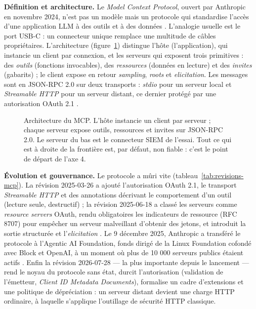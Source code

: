 
\textbf{Définition et architecture.} Le \emph{Model Context Protocol}, ouvert par Anthropic en novembre 2024, n'est pas un modèle mais un protocole qui standardise l'accès d'une application LLM à des outils et à des données \cite{mcpintro}. L'analogie usuelle est le port USB-C : un connecteur unique remplace une multitude de câbles propriétaires. L'architecture (figure~\ref{fig:archi-mcp}) distingue l'hôte (l'application), qui instancie un client par connexion, et les serveurs qui exposent trois primitives : des \emph{outils} (fonctions invocables), des \emph{ressources} (données en lecture) et des \emph{invites} (gabarits) ; le client expose en retour \emph{sampling}, \emph{roots} et \emph{elicitation}. Les messages sont en JSON-RPC 2.0 sur deux transports : \emph{stdio} pour un serveur local et \emph{Streamable HTTP} pour un serveur distant, ce dernier protégé par une autorisation OAuth 2.1 \cite{mcpspec2025}.

\begin{figure}[htbp]
\centering
{}
\caption{Architecture du MCP. L'hôte instancie un client par serveur ; chaque serveur expose outils, ressources et invites sur JSON-RPC 2.0. Le serveur du bas est le connecteur SIEM de l'essai. Tout ce qui est à droite de la frontière est, par défaut, non fiable : c'est le point de départ de l'axe 4.}\label{fig:archi-mcp}
\end{figure}

\textbf{Évolution et gouvernance.} Le protocole a mûri vite (tableau~\ref{tab:revisions-mcp}). La révision 2025-03-26 a ajouté l'autorisation OAuth 2.1, le transport \emph{Streamable HTTP} et des annotations décrivant le comportement d'un outil (lecture seule, destructif) ; la révision 2025-06-18 a classé les serveurs comme \emph{resource servers} OAuth, rendu obligatoires les indicateurs de ressource (RFC 8707) pour empêcher un serveur malveillant d'obtenir des jetons, et introduit la sortie structurée et l'\emph{elicitation} \cite{mcpspec2025}. Le 9 décembre 2025, Anthropic a transféré le protocole à l'Agentic AI Foundation, fonds dirigé de la Linux Foundation cofondé avec Block et OpenAI, à un moment où plus de 10 000 serveurs publics étaient actifs \cite{aaif}. Enfin la révision 2026-07-28 --- la plus importante depuis le lancement --- rend le noyau du protocole sans état, durcit l'autorisation (validation de l'émetteur, \emph{Client ID Metadata Documents}), formalise un cadre d'extensions et une politique de dépréciation \cite{mcpspec2026} : un serveur distant devient une charge HTTP ordinaire, à laquelle s'applique l'outillage de sécurité HTTP classique.




